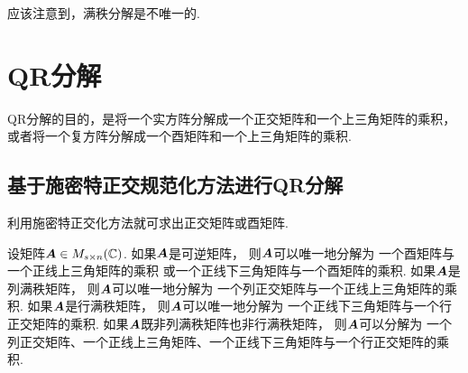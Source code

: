 应该注意到，满秩分解是不唯一的.


\section{QR分解}
QR分解的目的，是将一个实方阵分解成一个正交矩阵和一个上三角矩阵的乘积，
或者将一个复方阵分解成一个酉矩阵和一个上三角矩阵的乘积.

\subsection{基于施密特正交规范化方法进行QR分解}
利用施密特正交化方法就可求出正交矩阵或酉矩阵.

设矩阵\(\boldsymbol{A} \in M_{s \times n}(\mathbb{C})\).
如果\(\boldsymbol{A}\)是可逆矩阵，
则\(\boldsymbol{A}\)可以唯一地分解为
一个酉矩阵与一个正线上三角矩阵的乘积
或一个正线下三角矩阵与一个酉矩阵的乘积.
如果\(\boldsymbol{A}\)是列满秩矩阵，
则\(\boldsymbol{A}\)可以唯一地分解为
一个列正交矩阵与一个正线上三角矩阵的乘积.
如果\(\boldsymbol{A}\)是行满秩矩阵，
则\(\boldsymbol{A}\)可以唯一地分解为
一个正线下三角矩阵与一个行正交矩阵的乘积.
如果\(\boldsymbol{A}\)既非列满秩矩阵也非行满秩矩阵，
则\(\boldsymbol{A}\)可以分解为
一个列正交矩阵、一个正线上三角矩阵、一个正线下三角矩阵与一个行正交矩阵的乘积.


